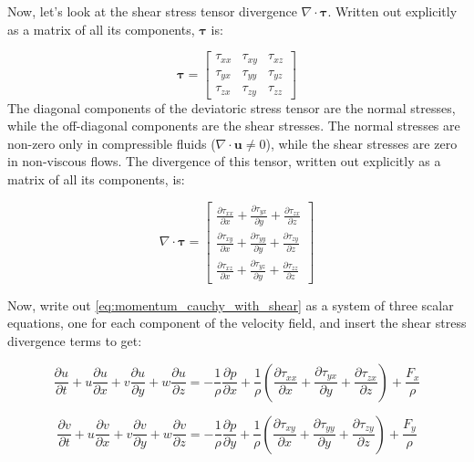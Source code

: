 \documentclass[12pt]{article}
\numberwithin{equation}{section}
\numberwithin{figure}{section}
\numberwithin{table}{section}
\begin{document}
Now, let's look at the shear stress tensor divergence $\nabla \cdot \boldsymbol{\tau}$.
Written out explicitly as a matrix of all its components, $\boldsymbol{\tau}$ is:

\begin{equation}
  \boldsymbol{\tau} = \begin{bmatrix}
    \tau_{xx} & \tau_{xy} & \tau_{xz} \\
    \tau_{yx} & \tau_{yy} & \tau_{yz} \\
    \tau_{zx} & \tau_{zy} & \tau_{zz}
  \end{bmatrix}
\end{equation}
The diagonal components of the deviatoric stress tensor are the normal stresses,
while the off-diagonal components are the shear stresses.
The normal stresses are non-zero only in compressible fluids ($\nabla \cdot \mathbf{u} \neq 0$),
while the shear stresses are zero in non-viscous flows.
The divergence of this tensor, written out explicitly as a matrix of all its
components, is:

\begin{equation}
  \nabla \cdot \boldsymbol{\tau} = \begin{bmatrix}
    \frac{\partial \tau_{xx}}{\partial x} + \frac{\partial \tau_{yx}}{\partial y} + \frac{\partial \tau_{zx}}{\partial z} \\
    \frac{\partial \tau_{xy}}{\partial x} + \frac{\partial \tau_{yy}}{\partial y} + \frac{\partial \tau_{zy}}{\partial z} \\
    \frac{\partial \tau_{xz}}{\partial x} + \frac{\partial \tau_{yz}}{\partial y} + \frac{\partial \tau_{zz}}{\partial z}
  \end{bmatrix}
\end{equation}

Now, write out \ref{eq:momentum_cauchy_with_shear} as a system of three scalar
equations, one for each component of the velocity field, and insert the shear
stress divergence terms to get:

\begin{equation}
  \frac{\partial u}{\partial t} + 
  u \frac{\partial u}{\partial x} + 
  v \frac{\partial u}{\partial y} + 
  w \frac{\partial u}{\partial z} = 
  - \frac{1}{\rho} \frac{\partial p}{\partial x} + 
  \frac{1}{\rho} \left( \frac{\partial \tau_{xx}}{\partial x} + \frac{\partial \tau_{yx}}{\partial y} + \frac{\partial \tau_{zx}}{\partial z} \right) + 
  \frac{F_x}{\rho}
\end{equation}

\begin{equation}
  \frac{\partial v}{\partial t} + 
  u \frac{\partial v}{\partial x} + 
  v \frac{\partial v}{\partial y} + 
  w \frac{\partial v}{\partial z} = 
  - \frac{1}{\rho} \frac{\partial p}{\partial y} + 
  \frac{1}{\rho} \left( \frac{\partial \tau_{xy}}{\partial x} + \frac{\partial \tau_{yy}}{\partial y} + \frac{\partial \tau_{zy}}{\partial z} \right) + 
  \frac{F_y}{\rho}
\end{equation}
\end{document}
